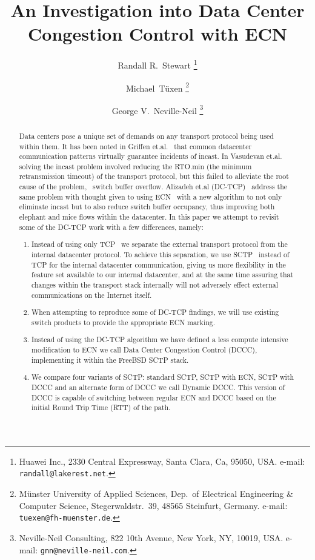 \documentclass[12pt]{article}
\begin{document}
%
%
\title{An Investigation into Data Center Congestion Control with ECN}
\author{%
Randall R.~Stewart%
\thanks{Huawei Inc.,
        2330 Central Expressway,
        Santa Clara, Ca, 95050,
        USA.
        e-mail: \texttt{randall@lakerest.net}.}
\and
Michael~T\"uxen%
\thanks{M\"unster University of Applied Sciences,
        Dep.~of Electrical Engineering \& Computer Science,
        Stegerwaldstr.~39,
        48565 Steinfurt,
        Germany.
        e-mail: \texttt{tuexen@fh-muenster.de}.}
\and
George V.~Neville-Neil%
\thanks{Neville-Neil Consulting,
        822 10th Avenue,
        New York, NY, 10019,
        USA.
        e-mail: \texttt{gnn@neville-neil.com}.}
}

\maketitle


\begin{abstract}
Data centers pose a unique set of demands on any transport protocol being used
within them. It has been noted in Griffen et.al.~\cite{griffen} that common datacenter
communication patterns virtually guarantee incidents of incast. In Vasudevan et.al.~\cite{vasudevan} solving the incast
problem involved reducing the RTO.min (the minimum retransmission timeout) of the transport protocol, but
this failed to alleviate the root cause of the problem, ~switch buffer
overflow. Alizadeh et.al (DC-TCP)~\cite{alizadeh} address the same problem
 with thought given to using ECN~\cite{rfc3168}  with a new algorithm to not only eliminate
incast but to also reduce switch buffer occupancy, thus improving both elephant and mice flows
within the datacenter. In this paper we attempt to revisit some of the DC-TCP  work with a few differences, namely:

\begin{enumerate}
 \item  Instead of using only TCP~\cite{rfc793} we separate the external transport protocol from the internal datacenter protocol.
 To achieve this separation, we use SCTP~\cite{rfc4960} instead of TCP
 for the internal datacenter communication, giving us more flexibility in the feature set available to our internal datacenter, and at the same
 time assuring that changes within the transport stack internally will not adversely effect external communications on
 the Internet itself.
\item  When attempting to reproduce some of DC-TCP findings, we will use existing switch products
to provide the appropriate ECN marking.
\item Instead of using the DC-TCP algorithm we have defined a less compute intensive modification
to ECN we call Data Center Congestion Control (DCCC), implementing it within the FreeBSD SCTP stack.
\item We compare four variants of SCTP: standard SCTP, SCTP with ECN, SCTP with DCCC and an alternate
form of DCCC we call Dynamic DCCC. This version of DCCC is capable of switching between regular ECN
and DCCC based on the initial Round Trip Time (RTT) of the path. 
\end{enumerate}

\end{abstract}
\end{document}
